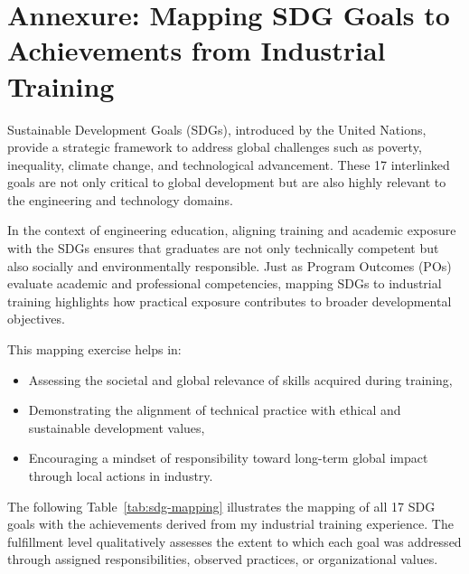 \chapter*{Annexure: Mapping SDG Goals to Achievements from Industrial Training}

\par Sustainable Development Goals (SDGs), introduced by the United Nations, provide a strategic framework to address global challenges such as poverty, inequality, climate change, and technological advancement. These 17 interlinked goals are not only critical to global development but are also highly relevant to the engineering and technology domains.

\par In the context of engineering education, aligning training and academic exposure with the SDGs ensures that graduates are not only technically competent but also socially and environmentally responsible. Just as Program Outcomes (POs) evaluate academic and professional competencies, mapping SDGs to industrial training highlights how practical exposure contributes to broader developmental objectives.

\par This mapping exercise helps in:
\begin{itemize}
    \item Assessing the societal and global relevance of skills acquired during training,
    \item Demonstrating the alignment of technical practice with ethical and sustainable development values,
    \item Encouraging a mindset of responsibility toward long-term global impact through local actions in industry.
\end{itemize}

\par The following Table~\ref{tab:sdg-mapping} illustrates the mapping of all 17 SDG goals with the achievements derived from my industrial training experience. The fulfillment level qualitatively assesses the extent to which each goal was addressed through assigned responsibilities, observed practices, or organizational values.


